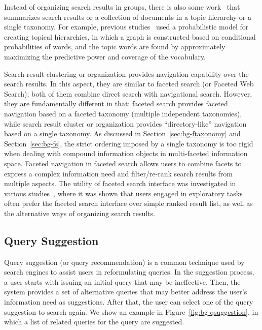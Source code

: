 
Instead of organizing search results in groups, there is also some work~\cite{lawrie2001finding,lawrie2003generating, nevill1999lexically} that summarizes search results or a collection of documents in a topic hierarchy or a single taxonomy. For example, previous studies~\cite{lawrie2001finding,lawrie2003generating} used a probabilistic model for creating topical hierarchies, in which a graph is constructed based on conditional probabilities of words, and the topic words are found by approximately maximizing the predictive power and coverage of the vocabulary.

Search result clustering or organization provides navigation capability over the search results. In this aspect, they are similar to faceted search (or Faceted Web Search); both of them combine direct search with navigational search. However, they are fundamentally different in that: faceted search provides faceted navigation based on a faceted taxonomy (multiple independent taxonomies), while search result cluster or organization provides ``directory-like'' navigation based on a single taxonomy. As discussed in Section~\ref{sec:bg-ftaxonomy} and Section~\ref{sec:bg-fs}, the strict ordering imposed by a single taxonomy is too rigid when dealing with compound information objects in multi-faceted information space. Faceted navigation in faceted search allows users to combine facets to express a complex information need and filter/re-rank search results from multiple aspects. The utility of faceted search interface was investigated in various studies~\cite{pollitt1998key,hearst2006clustering,pratt1999knowledge,yee2003faceted,kaki2005findex,rodden2001does}, where it was shown that users engaged in exploratory tasks often prefer the faceted search interface over simple ranked result list, as well as the alternative ways of organizing search results.


\subsection{Query Suggestion}
Query suggestion (or query recommendation) is a common technique used by search engines to assist users in reformulating queries. In the suggestion process, a user starts with issuing an initial query that may be ineffective. Then, the system provides a set of alternative queries that may better address the user's information need as suggestions. After that, the user can select one of the query suggestion to search again. We show an example in Figure~\ref{fig:bg-qsuggestion}, in which a list of related queries for the query  are suggested.  

